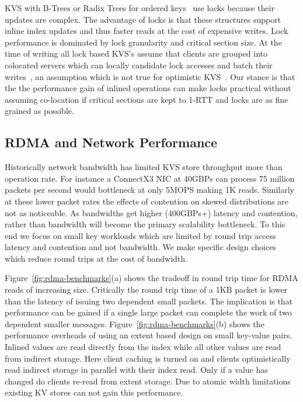 KVS with B-Trees or Radix Trees for ordered keys~\cite{sherman,smart} use locks because their
updates are complex.  The advantage of locks is that these structures support inline index updates
and thus faster reads at the cost of expensive writes. Lock performance is dominated by lock
granularity and critical section size. At the time of writing all lock based KVS's assume that
clients are grouped into colocated servers which can locally candidate lock accesses and batch their
writes~\cite{sherman,smart}, an assumption which is not true for optimistic
KVS~\cite{clover,fusee,race,ditto}. Our stance is that the the performance gain of inlined
operations can make locks practical without assuming co-location if critical sections are kept to
1-RTT and locks are as fine grained as possible.

\subsection{RDMA and Network Performance} Historically network bandwidth has limited KVS store
throughput more than operation rate. For instance a ConnectX3 NIC at 40GBPs can process 75 million
packets per second would bottleneck at only 5MOPS making 1K reads. Similarly at these lower packet
rates the effects of contention on skewed distributions are not as noticeable. As bandwidths get
higher (400GBPs+) latency and contention, rather than bandwidth will become the primary scalability
bottleneck. To this end we focus on small key workloads which are limited by round trip access
latency and contention and not bandwidth. We make specific design choices which reduce round trips
at the cost of bandwidth.

Figure~\ref{fig:rdma-benchmarks}(a) shows the tradeoff in round trip time for RDMA reads of
increasing size. Critically the round trip time of a 1KB packet is lower than the latency of issuing
two dependent small packets.  The implication is that performance can be gained if a single large
packet can complete the work of two dependent smaller messages. Figure~\ref{fig:rdma-benchmarks}(b)
shows the performance overheads of using an extent based design on small key-value pairs. Inlined
values are read directly from the index while all other values are read from indirect storage. Here
client caching is turned on and clients optimistically read indirect storage in parallel with their
index read. Only if a value has changed do clients re-read from extent storage. Due to atomic width
limitations existing KV stores can not gain this performance.


